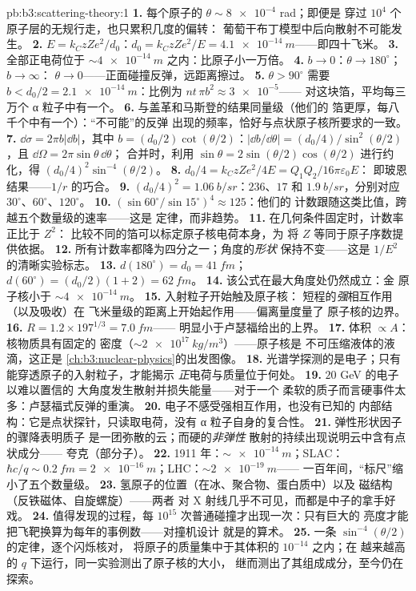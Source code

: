 \begin{solution}{pb:b3:scattering-theory:1}
\textbf{1.} 每个原子的 $\theta \sim \num{8e-4}$ rad；即便是
穿过 $10^4$ 个原子层的无规行走，也只累积几度的偏转：
葡萄干布丁模型中后向散射不可能发生。
\textbf{2.} $E = k_CzZe^2/d_0$：$d_0 = k_CzZe^2/E =
\qty{4.1e-14}{m}$——即四十飞米。
\textbf{3.} 全部正电荷位于
$\sim\qty{4e-14}{m}$ 之内：比原子小一万倍。
\textbf{4.} $b \to 0$：$\theta \to 180^\circ$；$b \to \infty$：
$\theta \to 0$——正面碰撞反弹，远距离擦过。
\textbf{5.} $\theta > 90^\circ$ 需要 $b < d_0/2 =
\qty{2.1e-14}{m}$：比例为 $nt\,\pi b^2 \approx \num{3e-5}$——
对这块箔，平均每三万个 α 粒子中有一个。
\textbf{6.} 与盖革和马斯登的结果同量级（他们的
箔更厚，每八千个中有一个）：“不可能”的反弹
出现的频率，恰好与点状原子核所要求的一致。
\textbf{7.} $\dd\sigma = 2\pi b|\dd b|$，其中 $b =
(d_0/2)\cot(\theta/2)$：$|\dd b/\dd\theta| = (d_0/4)/\sin^2(
\theta/2)$，且 $\dd\Omega = 2\pi\sin\theta\,\dd\theta$；
合并时，利用 $\sin\theta = 2\sin(\theta/2)\cos(\theta/2)$
进行约化，得 $(d_0/4)^2\sin^{-4}(\theta/2)$。
\textbf{8.} $d_0/4 = k_CzZe^2/4E = Q_1Q_2/16\pi\varepsilon_0E$：
即玻恩结果——$1/r$ 的巧合。
\textbf{9.} $(d_0/4)^2 = \qty{1.06}{b/sr}$：$236$、$17$ 和
$\qty{1.9}{b/sr}$，分别对应 $30^\circ$、$60^\circ$、$120^\circ$。
\textbf{10.} $(\sin60^\circ/\sin15^\circ)^4 \approx 125$：他们的
计数跟随这类比值，跨越五个数量级的速率——这是
定律，而非趋势。
\textbf{11.} 在几何条件固定时，计数率正比于 $Z^2$：
比较不同的箔可以标定原子核电荷本身，为
将 $Z$ 等同于原子序数提供依据。
\textbf{12.} 所有计数率都降为四分之一；角度的\emph{形状}
保持不变——这是 $1/E^2$ 的清晰实验标志。
\textbf{13.} $d(180^\circ) = d_0 = \qty{41}{fm}$；$d(60^\circ) =
(d_0/2)(1 + 2) = \qty{62}{fm}$。
\textbf{14.} 该公式在最大角度处仍然成立：金
原子核小于 $\sim\qty{4e-14}{m}$。
\textbf{15.} 入射粒子开始触及原子核：
短程的\emph{强}相互作用（以及吸收）在
飞米量级的距离上开始起作用——偏离量度量了
原子核的边界。
\textbf{16.} $R = 1.2 \times 197^{1/3} = \qty{7.0}{fm}$——
明显小于卢瑟福给出的上界。
\textbf{17.} 体积 $\propto A$：核物质具有固定的
密度（$\sim\qty{2e17}{kg/m^3}$）——原子核是
不可压缩液体的液滴，这正是
\cref{ch:b3:nuclear-physics}的出发图像。
\textbf{18.} 光谱学探测的是电子；只有
能穿透原子的入射粒子，才能揭示
\emph{正}电荷与质量位于何处。
\textbf{19.} $20$ GeV 的电子以难以置信的
大角度发生散射并损失能量——对于一个
柔软的质子而言硬事件太多：卢瑟福式反弹的重演。
\textbf{20.} 电子不感受强相互作用，也没有已知的
内部结构：它是点状探针，只读取电荷，没有
α 粒子自身的复合性。
\textbf{21.} 弹性形状因子的骤降表明质子
是一团弥散的云；而硬的\emph{非弹性}
散射的持续出现说明云中含有点状成分——
夸克（部分子）。
\textbf{22.} 1911 年：$\sim\qty{e-14}{m}$；SLAC：$\hbar c/q \sim
\qty{0.2}{fm} = \qty{2e-16}{m}$；LHC：$\sim\qty{2e-19}{m}$——
一百年间，“标尺”缩小了五个数量级。
\textbf{23.} 氢原子的位置（在冰、聚合物、蛋白质中）以及
磁结构（反铁磁体、自旋螺旋）——两者
对 X 射线几乎不可见，而都是中子的拿手好戏。
\textbf{24.} 值得发现的过程，每
$10^{15}$ 次普通碰撞才出现一次：只有巨大的
亮度才能把飞靶换算为每年的事例数——对撞机设计
就是的算术。
\textbf{25.} 一条 $\sin^{-4}(\theta/2)$ 的定律，逐个闪烁核对，
将原子的质量集中于其体积的 $10^{-14}$ 之内；在
越来越高的 $q$ 下运行，同一实验测出了原子核的大小，
继而测出了其组成成分，至今仍在探索。
\end{solution}
